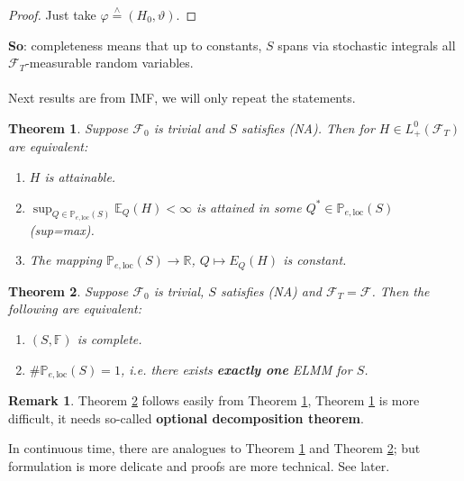 \documentclass[12pt,a4paper, twoside]{article}
\newtheorem{thm}{Theorem}[section]
\theoremstyle{definition}
\newtheorem{rem}{Remark}[section]
\newcommand{\EE}{\mathbb{E}} %
\newcommand{\PP}{\mathbb{P}} %
\newcommand{\teq}{\overset{\wedge}{=}}
\begin{document}
\begin{proof}
Just take $\varphi \teq (H_0, \vartheta)$. 
\end{proof}
\textbf{So}: completeness means that up to constants, $S$ spans via stochastic integrals all $\mathcal{F}_T$-measurable random variables. 
\\\\
Next results are from IMF, we will only repeat the statements.
\newpage
\begin{thm} \label{T62} Suppose $\mathcal{F}_0$ is trivial and $S$ satisfies (NA). Then for $H \in L_+^0( \mathcal{F}_T)$ are equivalent: 
\begin{enumerate}
\item $H$ is attainable.
\item $\sup_{Q \in \PP_{e, \text{loc}}(S)} \EE_Q(H) < \infty$ is attained in some $Q^* \in \PP_{e, \text{loc}}(S)$ (sup=max). 
\item The mapping $\PP_{e, \text{loc}}(S) \to \mathbb{R}$, $Q \mapsto E_Q(H)$ is constant.
\end{enumerate}
\end{thm}
\begin{thm} \label{T63} Suppose $\mathcal{F}_0$ is trivial, $S$ satisfies (NA) and $\mathcal{F}_T= \mathcal{F}$. Then the following are equivalent:
\begin{enumerate}
\item $(S, \mathbb{F})$ is complete.
\item $\# \mathbb{P}_{e, \text{loc}}(S)=1$, i.e. there exists \textbf{exactly one} ELMM for $S$. 
\end{enumerate}
\end{thm}
\begin{rem} Theorem \ref{T63} follows easily from Theorem \ref{T62}, Theorem \ref{T62} is more difficult, it needs so-called \textbf{optional decomposition theorem}.
\end{rem}
In continuous time, there are analogues to Theorem \ref{T62} and Theorem \ref{T63}; but formulation is more delicate and proofs are more technical. See later. 
\end{document}
